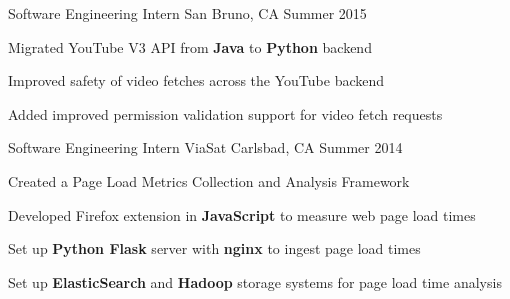 \begin{cventries}

\cventry
{Software Engineering Intern} %
{\google}%
{San Bruno, CA} %
{Summer 2015} %
{ %
\begin{cvitems}
\item {Migrated YouTube V3 API from \textbf{Java} to \textbf{Python} backend}
\item {Improved safety of video fetches across the YouTube backend}
\item {Added improved permission validation support for video fetch requests}
\end{cvitems} 
}


\cventry
{Software Engineering Intern} %
{ViaSat} %
{Carlsbad, CA} %
{Summer 2014} %
{ %
\begin{cvitems}
\item {Created a Page Load Metrics Collection and Analysis Framework}
\item {Developed Firefox extension in \textbf{JavaScript} to measure web page load times}
\item {Set up \textbf{Python Flask} server with \textbf{nginx} to ingest page load times}
\item {Set up \textbf{ElasticSearch} and \textbf{Hadoop} storage systems for page load time analysis}
\end{cvitems}
}


\end{cventries}
